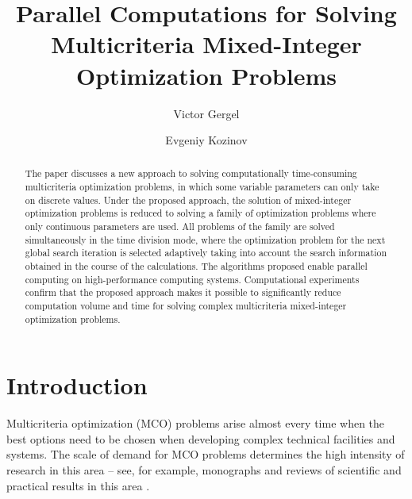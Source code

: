 \documentclass{svproc}
\begin{document}
\title{Parallel Computations for Solving Multicriteria Mixed-Integer Optimization Problems}

\author{Victor Gergel \and Evgeniy Kozinov}


\maketitle              %


\begin{abstract}
The paper discusses a new approach to solving computationally time-consuming multicriteria optimization problems, in which some variable parameters can only take on discrete values. Under the proposed approach, the solution of mixed-integer optimization problems is reduced to solving a family of optimization problems where only continuous parameters are used. All problems of the family are solved simultaneously in the time division mode, where the optimization problem for the next global search iteration is selected adaptively taking into account the search information obtained in the course of the calculations. The algorithms proposed enable parallel computing on high-performance computing systems. Computational experiments confirm that the proposed approach makes it possible to significantly reduce computation volume and time for solving complex multicriteria mixed-integer optimization problems.
\end{abstract}


\section{Introduction}\label{sec:1}

Multicriteria optimization (MCO) problems arise almost every time when the best options need to be chosen when developing complex technical facilities and systems. The scale of demand for MCO problems determines the high intensity of research in this area -- see, for example, monographs \cite{c1,c2,c3,c4,c5} and reviews of scientific and practical results in this area \cite{c6,c7,c8,c9}.
\end{document}

